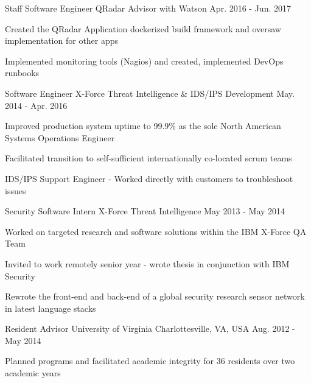 \begin{cventries}
  \cventry
    {Staff Software Engineer \enskip\textendash\enskip QRadar Advisor with Watson}
    {}
    {} %
    {Apr. 2016 - Jun. 2017}
    {
      \begin{cvitems}
        \item {Created the QRadar Application dockerized build framework and oversaw implementation for other apps}
        \item {Implemented monitoring tools (Nagios) and created, implemented DevOps runbooks}
      \end{cvitems}
    }
            
  \cventry
    {Software Engineer \enskip\textendash\enskip X-Force Threat Intelligence \& IDS/IPS Development}
    {}
    {} %
    {May. 2014 - Apr. 2016}
    {
    \begin{cvitems}
      \item {Improved production system uptime to 99.9\% as the sole North American Systems Operations Engineer}
      \item {Facilitated transition to self-sufficient internationally co-located scrum teams}
      \item {IDS/IPS Support Engineer - Worked directly with customers to troubleshoot issues}
    \end{cvitems}
    }

  \cventry
    {Security Software Intern \enskip\textendash\enskip X-Force Threat Intelligence}
    {}
    {} %
    {May 2013 - May 2014}
    {
    \begin{cvitems}
      \item {Worked on targeted research and software solutions within the IBM X-Force QA Team}
      \item {Invited to work remotely senior year - wrote thesis in conjunction with IBM Security}
      \item {Rewrote the front-end and back-end of a global security research sensor network in latest language stacks}
    \end{cvitems}
    }

  \cventry
    {Resident Advisor}
    {University of Virginia}
    {Charlottesville, VA, USA}
    {Aug. 2012 - May 2014}
    {
      \begin{cvitems}
	      \item {Planned programs and facilitated academic integrity for 36 residents over two academic years}
      \end{cvitems}
    }


\end{cventries}
